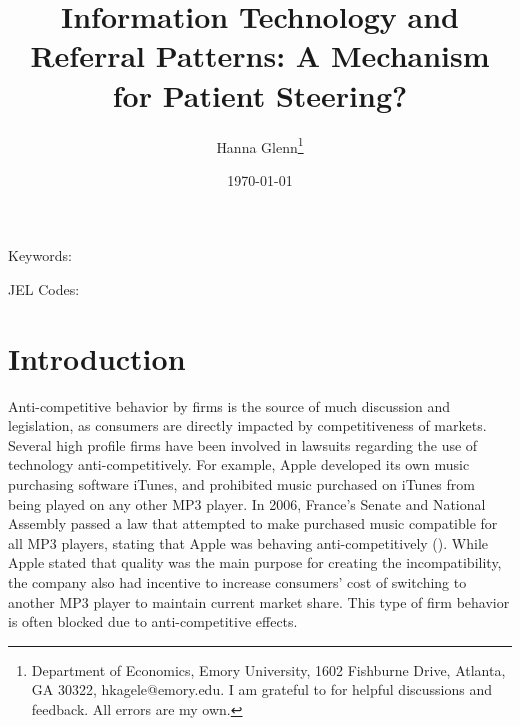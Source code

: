 \documentclass[12pt]{article}
\begin{document}
	
	
	
	
	\linespread{1.2}\title{\vspace{-0.5in} Information Technology and Referral Patterns: A Mechanism for Patient Steering?} 
	
	
	\date{\today}
	
	\author{Hanna Glenn\footnote{Department of Economics, Emory University, 1602 Fishburne Drive, Atlanta, GA 30322, hkagele@emory.edu. I am grateful to for helpful discussions and feedback. All errors are my own.} }
	
	\maketitle
	
	\vspace{-0.2in}
	
	\singlespacing\maketitle
	
	\begin{abstract}
		{\small
			
			
		} 
	\end{abstract}
	
	
	
	
	\vspace{0.1in}
	
	\noindent Keywords: 
	
	\noindent JEL Codes: 
	
	\onehalfspacing
	
	\newpage
	
	\onehalfspacing

 \section{Introduction}
	
	Anti-competitive behavior by firms is the source of much discussion and legislation, as consumers are directly impacted by competitiveness of markets. Several high profile firms have been involved in lawsuits regarding the use of  technology anti-competitively. For example, Apple developed its own music purchasing software iTunes, and prohibited music purchased on iTunes from being played on any other MP3 player. In 2006, France's Senate and National Assembly passed a law that attempted to make purchased music compatible for all MP3 players, stating that Apple was behaving anti-competitively (\cite{economist_2006}). While Apple stated that quality was the main purpose for creating the incompatibility, the company also had incentive to increase consumers' cost of switching to another MP3 player to maintain current market share. This type of firm behavior is often blocked due to anti-competitive effects.  
\end{document}
